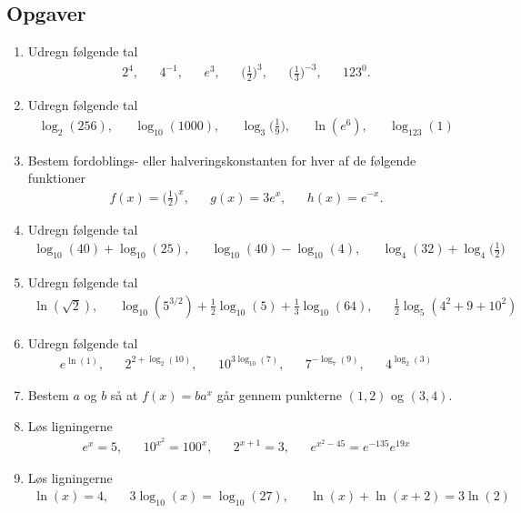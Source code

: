 \subsection{Opgaver}

\begin{enumerate}
	\item Udregn følgende tal
	\begin{align*}
	2^4,&& 4^{-1},&& e^3, &&\Big(\frac{1}{2}\Big)^{3},&&\Big(\frac{1}{3}\Big)^{-3},&& 123^0.
	\end{align*}
	\item Udregn følgende tal
	\begin{align*}
	\log_2(256),&& \log_{10}(1000),&& \log_3\Big(\frac{1}{9}\Big),&& \ln(e^6),&&\log_{123}(1)
	\end{align*}
	\item Bestem fordoblings- eller halveringskonstanten for hver af de følgende funktioner
	\begin{align*}
	f(x)=\Big(\frac{1}{2}\Big)^x,&&g(x)=3e^x,&&h(x)=e^{-x}.
	\end{align*}
	\item Udregn følgende tal
	\begin{align*}
	\log_{10}(40)+\log_{10}(25),&&\log_{10}(40)-\log_{10}(4),&& \log_4(32)+\log_4\Big(\frac{1}{2}\Big)
	\end{align*}
	\item Udregn følgende tal
	\begin{align*}
	\ln(\sqrt{2}),&& \log_{10}(5^{3/2})+\frac{1}{2}\log_{10}(5)+\frac{1}{3}\log_{10}(64),&& \frac{1}{2}\log_5(4^2+9+10^2)
	\end{align*}
	\item Udregn følgende tal
	\begin{align*}
	e^{\ln(1)},&&2^{2+\log_2(10)},&& 10^{3\log_{10}(7)},&& 7^{-\log_7(9)},&& 4^{\log_2(3)}
	\end{align*}
	\item Bestem $a$ og $b$ så at $f(x)=ba^x$ går gennem punkterne $(1,2)$ og $(3,4)$.
	
	\item Løs ligningerne 
	\begin{align*}
	e^x=5,&& 10^{x^2}=100^x,&& 2^{x+1}=3,&& e^{x^2-45}=e^{-135}e^{19x}
	\end{align*}
	
	\item Løs ligningerne 
	\begin{align*}
	\ln(x)=4,&& 3\log_{10}(x)=\log_{10}(27),&&\ln(x)+\ln(x+2)=3\ln(2)
	\end{align*}
	

\end{enumerate}
